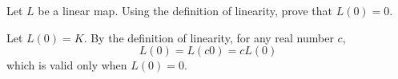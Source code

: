 \documentclass{ximera}
\begin{document}
\begin{exercise} \label{c4.3.11}
Let $L$ be a linear map.  Using the definition of linearity,
prove that $L(0)=0$.

\begin{solution}

Let $L(0) = K$.
By the definition of linearity, for any real number $c$,
\[ L(0) = L(c0) = cL(0) \]
which is valid only when $L(0) = 0$.

\end{solution}
\end{exercise}
\end{document}

